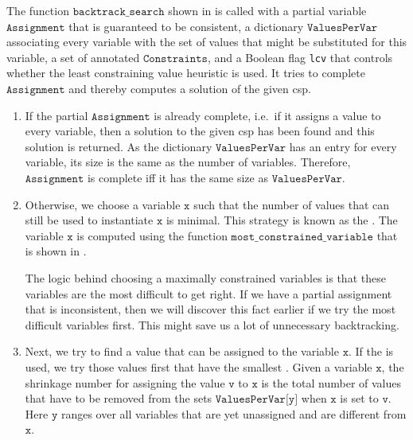The function $\texttt{backtrack\_search}$ shown in  is called with a
partial variable $\texttt{Assignment}$ that is guaranteed to be consistent, a dictionary
$\texttt{ValuesPerVar}$ associating every variable with the set of values that might be substituted for this variable, a
set of annotated $\texttt{Constraints}$, and a Boolean flag \texttt{lcv} that controls whether the
least constraining value heuristic is used.  It tries to complete $\texttt{Assignment}$ and thereby computes a
solution of the given \ac{csp}.  
\begin{enumerate}
\item If the partial $\texttt{Assignment}$ is already complete, i.e.~if it assigns a value to every variable, 
      then a solution to the given \ac{csp} has been found and this solution is returned.  As the
      dictionary $\texttt{ValuesPerVar}$ has an entry for every variable, its size is the same as the number of
      variables. Therefore, $\texttt{Assignment}$ is complete iff it has the same size as $\texttt{ValuesPerVar}$.
\item Otherwise, we choose a variable $\texttt{x}$ such that the number of values that can still be used to
      instantiate $\texttt{x}$ is minimal.  This strategy is known as the . 
      The variable $\texttt{x}$ is computed using the function
      $\texttt{most\_constrained\_variable}$ that is shown in .
      
      The logic behind choosing a maximally constrained variables is that these variables are the most
      difficult to get right.  If we have a partial assignment that is inconsistent, then we will discover this
      fact earlier if we try the most difficult variables first.  This might save us a lot of unnecessary
      backtracking. 
\item Next, we try to find a value that can be assigned to the variable $\texttt{x}$.
      If the  is used, we try those values first that have the
      smallest .  Given a variable $\texttt{x}$, the shrinkage number for assigning the
      value $\texttt{v}$ to $\texttt{x}$ is the total number of values 
      that have to be removed from the sets $\texttt{ValuesPerVar[y]}$ when $\texttt{x}$ is set to $\texttt{v}$.
      Here $\texttt{y}$ ranges over all variables that are yet unassigned and are different from $\texttt{x}$.


\end{enumerate}
